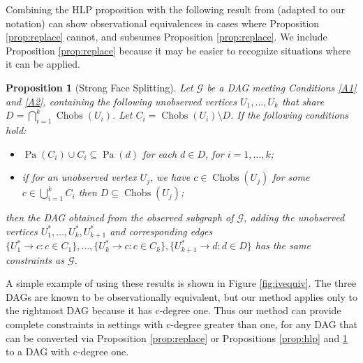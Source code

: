 \documentclass[12pt]{article}
\newtheorem{proposition}{Proposition}
\DeclareMathOperator{\Chobs}{Chobs}
\DeclareMathOperator{\Pa}{Pa}
\begin{document}
Combining the HLP proposition with the following result from \citet{ansanelli2025observationalpartialordercausal} (adapted to our notation) can show observational equivalences in cases where Proposition \ref{prop:replace} cannot, and subsumes Proposition \ref{prop:replace}. We include Proposition \ref{prop:replace} because it may be easier to recognize situations where it can be applied. 

\begin{proposition}[Strong Face Splitting] \label{prop:strong}
  Let $\mathcal{G}$ be a DAG meeting Conditions \ref{A1} and \ref{A2}, containing the following unobserved vertices 
  $U_1,\ldots,U_k$ that share $D = \bigcap_{i=1}^k \Chobs(U_i)$.  Let $C_i = \Chobs(U_i) \setminus D$. If the following conditions hold:
  \begin{itemize}
      \item $\Pa(C_i) \cup C_i \subseteq \Pa(d)$ for each $d \in D$, for $i = 1, \dots, k$;
      \item if for an unobserved vertex $U_j$, we have $c \in \Chobs(U_j)$ for some $c \in \bigcup_{i=1}^k C_i$ then $D \subseteq \Chobs(U_j)$;
  \end{itemize}
  then the DAG obtained from the observed subgraph of $\mathcal{G}$, adding the unobserved vertices $U^*_1, \ldots, U^*_k, U^*_{k+1}$ and corresponding edges $\{U^*_1 \rightarrow c: c \in C_1\}, \ldots, \{U^*_k \rightarrow c: c \in C_k\}, \{U^*_{k+1} \rightarrow d: d \in D\}$ has the same constraints as $\mathcal{G}$.
\end{proposition}

A simple example of using these results is shown in Figure \ref{fig:ivequiv}. The three DAGs are known to be observationally equivalent, but our method applies only to the rightmost DAG because it has c-degree one. Thus our method can provide complete constraints in settings with c-degree greater than one, for any DAG that can be converted via Proposition \ref{prop:replace} or Propositions \ref{prop:hlp} and \ref{prop:strong} to a DAG with c-degree one. 
\end{document}
